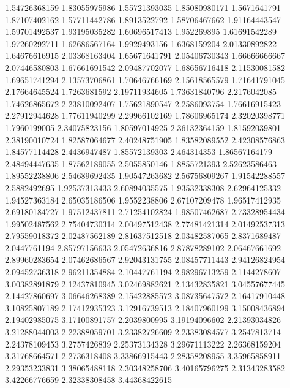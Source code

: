   1.54726368159    1.83055975986
  1.55721393035    1.85080980171
   1.5671641791    1.87107402162
  1.57711442786     1.8913522792
  1.58706467662    1.91164443547
  1.59701492537    1.93195035282
  1.60696517413      1.952269895
  1.61691542289    1.97260292711
  1.62686567164     1.9929493156
   1.6368159204    2.01330892822
  1.64676616915    2.03368163404
  1.65671641791    2.05406730343
  1.66666666667    2.07446580803
  1.67661691542    2.09487702077
  1.68656716418    2.11530081582
  1.69651741294    2.13573706861
  1.70646766169    2.15618565579
  1.71641791045    2.17664645524
   1.7263681592    2.19711934605
  1.73631840796     2.2176042085
  1.74626865672    2.23810092407
  1.75621890547     2.2586093754
  1.76616915423    2.27912944628
  1.77611940299    2.29966102169
  1.78606965174    2.32020398771
   1.7960199005    2.34075823156
  1.80597014925    2.36132364159
  1.81592039801    2.38190010724
  1.82587064677    2.40248751905
  1.83582089552    2.42308576863
  1.84577114428     2.4436947487
  1.85572139303      2.464314353
  1.86567164179    2.48494447635
  1.87562189055     2.5055850146
   1.8855721393    2.52623586463
  1.89552238806    2.54689692435
  1.90547263682    2.56756809267
  1.91542288557     2.5882492695
  1.92537313433    2.60894035575
  1.93532338308    2.62964125332
  1.94527363184    2.65035186506
   1.9552238806    2.67107209478
  1.96517412935    2.69180184727
  1.97512437811    2.71254102824
  1.98507462687    2.73328954434
  1.99502487562    2.75404730314
  2.00497512438    2.77481421314
  2.01492537313    2.79559018372
  2.02487562189    2.81637512518
  2.03482587065     2.8371689487
   2.0447761194    2.85797156633
  2.05472636816    2.87878289102
  2.06467661692    2.89960283654
  2.07462686567    2.92043131755
  2.08457711443    2.94126824954
  2.09452736318    2.96211354884
  2.10447761194    2.98296713259
   2.1144278607    3.00382891879
  2.12437810945    3.02469882621
  2.13432835821    3.04557677445
  2.14427860697    3.06646268389
  2.15422885572    3.08735647572
  2.16417910448    3.10825807189
  2.17412935323    3.12916739513
  2.18407960199    3.15008436894
  2.19402985075    3.17100891757
   2.2039800995    3.19194096602
  2.21393034826    3.21288044003
  2.22388059701    3.23382726609
  2.23383084577     3.2547813714
  2.24378109453     3.2757426839
  2.25373134328    3.29671113222
  2.26368159204    3.31768664571
   2.2736318408    3.33866915443
  2.28358208955    3.35965858911
  2.29353233831    3.38065488118
  2.30348258706    3.40165796275
  2.31343283582    3.42266776659
  2.32338308458    3.44368422615

